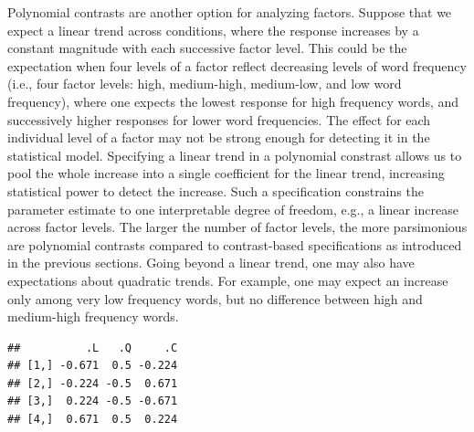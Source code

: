 \documentclass[12pt,]{krantz}
\newenvironment{Shaded}{\begin{snugshade}}{\end{snugshade}}
\newcommand{\DecValTok}[1]{\textcolor[rgb]{0.00,0.00,0.81}{#1}}
\newcommand{\KeywordTok}[1]{\textcolor[rgb]{0.13,0.29,0.53}{\textbf{#1}}}
\newcommand{\NormalTok}[1]{#1}
\newcommand{\OperatorTok}[1]{\textcolor[rgb]{0.81,0.36,0.00}{\textbf{#1}}}
\newcommand{\StringTok}[1]{\textcolor[rgb]{0.31,0.60,0.02}{#1}}
\theoremstyle{definition}
\theoremstyle{definition}
\theoremstyle{definition}
\theoremstyle{remark}
\begin{document}
Polynomial contrasts are another option for analyzing factors. Suppose that we expect a linear trend across conditions, where the response increases by a constant magnitude with each successive factor level. This could be the expectation when four levels of a factor reflect decreasing levels of word frequency (i.e., four factor levels: high, medium-high, medium-low, and low word frequency), where one expects the lowest response for high frequency words, and successively higher responses for lower word frequencies. The effect for each individual level of a factor may not be strong enough for detecting it in the statistical model. Specifying a linear trend in a polynomial constrast allows us to pool the whole increase into a single coefficient for the linear trend, increasing statistical power to detect the increase. Such a specification constrains the parameter estimate to one interpretable degree of freedom, e.g., a linear increase across factor levels. The larger the number of factor levels, the more parsimonious are polynomial contrasts compared to contrast-based specifications as introduced in the previous sections. Going beyond a linear trend, one may also have expectations about quadratic trends. For example, one may expect an increase only among very low frequency words, but no difference between high and medium-high frequency words.

\begin{Shaded}
\end{Shaded}

\begin{verbatim}
##          .L   .Q     .C
## [1,] -0.671  0.5 -0.224
## [2,] -0.224 -0.5  0.671
## [3,]  0.224 -0.5 -0.671
## [4,]  0.671  0.5  0.224
\end{verbatim}
\end{document}

